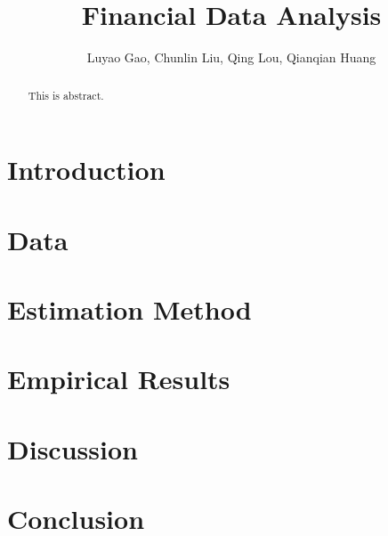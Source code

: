 \documentclass[12pt,letterpaper]{article}
\begin{document}
\title{\textbf{\Large Financial Data Analysis}}
\author{Luyao Gao, Chunlin Liu, Qing Lou, Qianqian Huang}
\date{}
\maketiitle 


\begin{abstract}
This is abstract.
\end{abstract}


\section{Introduction}

\section{Data}

\section{Estimation Method}

\section{Empirical Results}

\section{Discussion}

\section{Conclusion}
\end{document}
